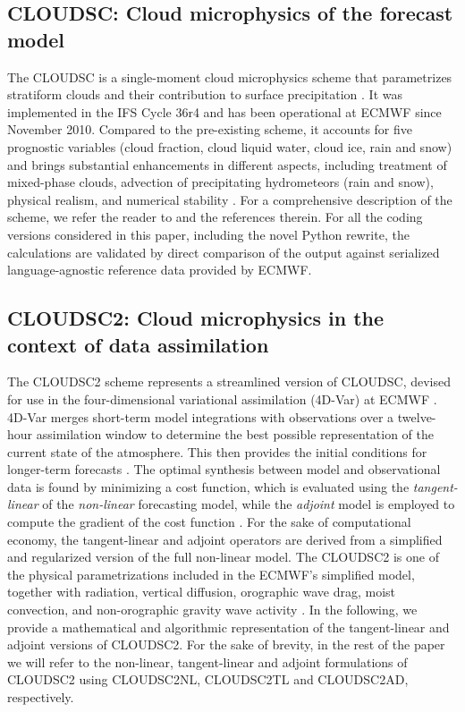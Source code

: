 \documentclass[gmd,manuscript,online]{copernicus}
\begin{document}
	\subsection{CLOUDSC: Cloud microphysics of the forecast model}

	The CLOUDSC is a single-moment cloud microphysics scheme that parametrizes stratiform clouds and their contribution to surface precipitation \citep{ifs48r1}. It was implemented in the IFS Cycle 36r4 and has been operational at ECMWF since November 2010. Compared to the pre-existing scheme, it accounts for five prognostic variables (cloud fraction, cloud liquid water, cloud ice, rain and snow) and brings substantial enhancements in different aspects, including treatment of mixed-phase clouds, advection of precipitating hydrometeors (rain and snow), physical realism, and numerical stability \citep{nogherotto16}. For a comprehensive description of the scheme, we refer the reader to \citet{forbes11} and the references therein. For all the coding versions considered in this paper, including the novel Python rewrite, the calculations are validated by direct comparison of the output against serialized language-agnostic reference data provided by ECMWF.

	\subsection{CLOUDSC2: Cloud microphysics in the context of data assimilation}
	\label{section:cloudsc2}

	The CLOUDSC2 scheme represents a streamlined version of CLOUDSC, devised for use in the four-dimensional variational assimilation (4D-Var) at ECMWF \citep{courtier94}. 4D-Var merges short-term model integrations with observations over a twelve-hour assimilation window to determine the best possible representation of the current state of the atmosphere. This then provides the initial conditions for longer-term forecasts \citep{janiskova23}. The optimal synthesis between model and observational data is found by minimizing a cost function, which is evaluated using the \emph{tangent-linear} of the \emph{non-linear} forecasting model, while the \emph{adjoint} model is employed to compute the gradient of the cost function \citep{errico97, janiskova99}. For the sake of computational economy, the tangent-linear and adjoint operators are derived from a simplified and regularized version of the full non-linear model. The CLOUDSC2 is one of the physical parametrizations included in the ECMWF's simplified model, together with radiation, vertical diffusion, orographic wave drag, moist convection, and non-orographic gravity wave activity \citep{janiskova23}. In the following, we provide a mathematical and algorithmic representation of the tangent-linear and adjoint versions of CLOUDSC2. For the sake of brevity, in the rest of the paper we will refer to the non-linear, tangent-linear and adjoint formulations of CLOUDSC2 using CLOUDSC2NL, CLOUDSC2TL and CLOUDSC2AD, respectively.
\end{document}
